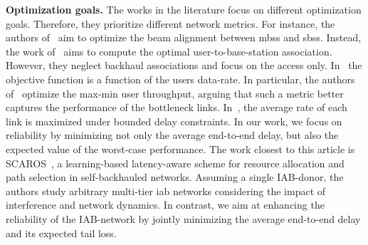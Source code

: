 \textbf{Optimization goals.} The works in the literature focus on different optimization goals. Therefore, they prioritize different network metrics. For instance, the authors of~\cite{hur2013millimeter} aim to optimize the beam alignment between \glspl{mbs} and \glspl{sbs}. Instead, the work of~\cite{alizadeh2019load} aims to compute the optimal user-to-base-station association. However, they neglect backhaul associations and focus on the access only. In~\cite{kwon2019joint, alizadeh2019load, zhu2016qos, yuan2018optimal} the objective function is a function of the users data-rate. In particular, the authors of~\cite{yuan2018optimal} optimize the max-min user throughput, arguing that such a metric better captures the performance of the bottleneck links. In~\cite{vu2018path}, the average rate of each link is maximized under bounded delay constraints. In our work, we focus on reliability by minimizing not only the average end-to-end delay, but also the expected value of the worst-case performance.
The work closest to this article is SCAROS~\cite{ortiz2019scaros},  a learning-based latency-aware scheme for resource allocation and path selection in self-backhauled networks. Assuming a single IAB-donor, the authors study arbitrary multi-tier \gls{iab} networks considering the impact of interference and network dynamics. In contrast, we aim at enhancing the reliability of the IAB-network by jointly minimizing the average end-to-end delay and its expected tail loss. 